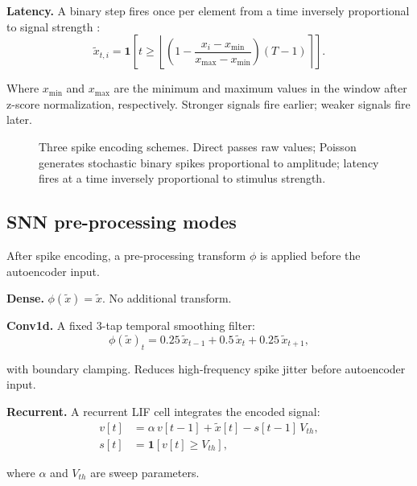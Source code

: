 \documentclass[conference]{IEEEtran}
\begin{document}
\textbf{Latency.} A binary step fires once per element from a time
inversely proportional to signal strength \cite{thorpe1998rank}:
\begin{equation}
  \tilde{x}_{t,i} = \mathbf{1}\!\left[t \geq
    \left\lfloor\!\left(1 - \frac{x_i - x_{\min}}{x_{\max}-x_{\min}}
    \right)(T-1)\right\rceil\right].
\end{equation}
\par Where $x_{\min}$ and $x_{\max}$ are the minimum and maximum values in the window after z-score normalization, respectively.  Stronger signals fire earlier; weaker signals fire later.

\begin{figure}[!t]
  \centering
  
  \caption{Three spike encoding schemes. Direct passes raw values; Poisson generates stochastic binary spikes proportional to amplitude; latency fires at a time inversely proportional to stimulus strength.}
  \label{fig:encodings}
\end{figure}

\subsection{SNN pre-processing modes}
\label{sec:modes}

\par After spike encoding, a pre-processing transform $\phi$ is applied
before the autoencoder input.

\textbf{Dense.} $\phi(\tilde{x}) = \tilde{x}$.  No additional transform.

\textbf{Conv1d.} A fixed 3-tap temporal smoothing filter:
\begin{equation}
  \phi(\tilde{x})_t = 0.25\,\tilde{x}_{t-1} + 0.5\,\tilde{x}_t
                    + 0.25\,\tilde{x}_{t+1},
\end{equation}
\par with boundary clamping.  Reduces high-frequency spike jitter before
autoencoder input.

\textbf{Recurrent.}  A recurrent LIF cell integrates the encoded signal:
\begin{align}
  v[t] &= \alpha\, v[t-1] + \tilde{x}[t] - s[t-1]\,V_{th},\\
  s[t] &= \mathbf{1}[v[t] \geq V_{th}],
\end{align}
\par where $\alpha$ and $V_{th}$ are sweep parameters.
\end{document}
